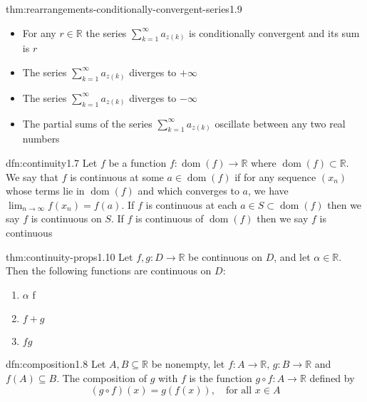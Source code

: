 \documentclass[landscape, 8pt]{extarticle}
\DeclareMathOperator{\dom}{dom}
\begin{document}
\begin{multicols}{3}
\begin{thm}{thm:rearrangements-conditionally-convergent-series}{1.9}
	\begin{itemize}
		\setlength\itemsep{0em}
		\item For any $r\in\mathbb{R}$ the series $\sum_{k=1}^{\infty} a_{z(k)}$ is conditionally convergent and its sum is $r$

		\item The series $\sum_{k=1}^{\infty} a_{z(k)}$ diverges to $+\infty$

		\item The series $\sum_{k=1}^{\infty} a_{z(k)}$ diverges to $-\infty$

		\item The partial sums of the series $\sum_{k=1}^{\infty} a_{z(k)}$ oscillate between any two real numbers

	\end{itemize}
\end{thm}


\begin{dfn}[Continuity]{dfn:continuity}{1.7}
	Let $f$ be a function $f : \dom(f) \to \mathbb{R}$ where $\dom(f)\subset \mathbb{R}$. We say that $f$ is continuous at some $a\in \dom(f)$ if for any sequence $(x_{n})$ whose terms lie in $\dom(f)$ and which converges to $a$, we have $\lim_{n\to \infty} f(x_{n}) = f(a)$. If $f$ is continuous at each $a\in S \subset \dom(f)$ then we say $f$ is continuous on $S$. If $f$ is continuous of $\dom(f)$ then we say $f$ is continuous
\end{dfn}

\begin{thm}{thm:continuity-props}{1.10}
	Let $f, g : D \to \mathbb{R}$ be continuous on $D$, and let $\alpha\in \mathbb{R}$. Then the following functions are continuous on $D:$
	\vspace{-10pt}
	\begin{multicols}{3}
		\begin{enumerate}
			\item $\alpha$ f
			\item $f + g$
			\item $fg$
		\end{enumerate}
	\end{multicols}
\end{thm}

\begin{dfn}[Composition]{dfn:composition}{1.8}
	Let $A, B \subseteq \mathbb{R}$ be nonempty, let $f : A \to \mathbb{R},\, g : B \to \mathbb{R}$ and $f(A) \subseteq B$. The composition of $g$ with $f$ is the function $g \circ f : A \to \mathbb{R}$ defined by
	\[(g \circ f)(x) = g(f(x)), \quad \text{for all $x\in A$}\]
\end{dfn}


\end{multicols}
\end{document}
